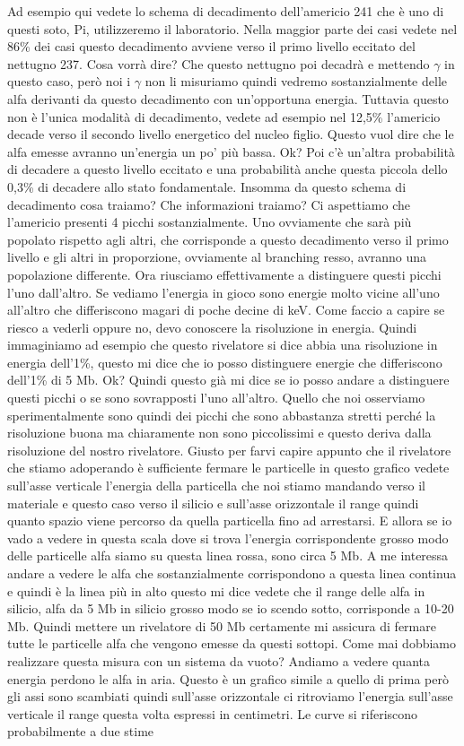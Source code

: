 Ad esempio qui vedete lo schema di decadimento dell'americio 241 che è uno di questi soto, Pi, utilizzeremo il laboratorio. Nella maggior parte dei casi vedete nel 86\% dei casi questo decadimento avviene verso il primo livello eccitato del nettugno 237. Cosa vorrà dire? Che questo nettugno poi decadrà e mettendo $\gamma$ in questo caso, però noi i $\gamma$ non li misuriamo quindi vedremo sostanzialmente delle alfa derivanti da questo decadimento con un'opportuna energia. Tuttavia questo non è l'unica modalità di decadimento, vedete ad esempio nel 12,5\% l'americio decade verso il secondo livello energetico del nucleo figlio. Questo vuol dire che le alfa emesse avranno un'energia un po' più bassa. Ok? Poi c'è un'altra probabilità di decadere a questo livello eccitato e una probabilità anche questa piccola dello 0,3\% di decadere allo stato fondamentale. Insomma da questo schema di decadimento cosa traiamo? Che informazioni traiamo? Ci aspettiamo che l'americio presenti 4 picchi sostanzialmente. Uno ovviamente che sarà più popolato rispetto agli altri, che corrisponde a questo decadimento verso il primo livello e gli altri in proporzione, ovviamente al branching resso, avranno una popolazione differente. Ora riusciamo effettivamente a distinguere questi picchi l'uno dall'altro. Se vediamo l'energia in gioco sono energie molto vicine all'uno all'altro che differiscono magari di poche decine di keV. Come faccio a capire se riesco a vederli oppure no, devo conoscere la risoluzione in energia. Quindi immaginiamo ad esempio che questo rivelatore si dice abbia una risoluzione in energia dell'1\%, questo mi dice che io posso distinguere energie che differiscono dell'1\% di 5 Mb. Ok? Quindi questo già mi dice se io posso andare a distinguere questi picchi o se sono sovrapposti l'uno all'altro. Quello che noi osserviamo sperimentalmente sono quindi dei picchi che sono abbastanza stretti perché la risoluzione buona ma chiaramente non sono piccolissimi e questo deriva dalla risoluzione del nostro rivelatore. Giusto per farvi capire appunto che il rivelatore che stiamo adoperando è sufficiente fermare le particelle in questo grafico vedete sull'asse verticale l'energia della particella che noi stiamo mandando verso il materiale e questo caso verso il silicio e sull'asse orizzontale il range quindi quanto spazio viene percorso da quella particella fino ad arrestarsi. E allora se io vado a vedere in questa scala dove si trova l'energia corrispondente grosso modo delle particelle alfa siamo su questa linea rossa, sono circa 5 Mb. A me interessa andare a vedere le alfa che sostanzialmente corrispondono a questa linea continua e quindi è la linea più in alto questo mi dice vedete che il range delle alfa in silicio, alfa da 5 Mb in silicio grosso modo se io scendo sotto, corrisponde a 10-20 Mb. Quindi mettere un rivelatore di 50 Mb certamente mi assicura di fermare tutte le particelle alfa che vengono emesse da questi sottopi. Come mai dobbiamo realizzare questa misura con un sistema da vuoto? Andiamo a vedere quanta energia perdono le alfa in aria. Questo è un grafico simile a quello di prima però gli assi sono scambiati quindi sull'asse orizzontale ci ritroviamo l'energia sull'asse verticale il range questa volta espressi in centimetri. Le curve si riferiscono probabilmente a due stime 